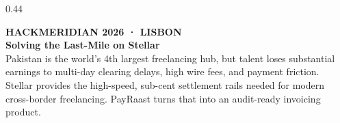 \documentclass[aspectratio=169, 10pt, t]{beamer}
\begin{document}
\begin{frame}[plain]
\begin{columns}[T]
    \begin{column}{0.44\textwidth}
      \begin{tcolorbox}[colframe=hmNavyText, colback=hmNavyText, boxrule=0.75pt,
        sharp corners, left=9pt, right=9pt, top=7pt, bottom=7pt, enhanced,
        drop fuzzy shadow=gray!12]
        
        {\fontsize{6.5}{7.5}\selectfont\bfseries\textcolor{hmYellow}{HACKMERIDIAN 2026 · LISBON}}\\[0.05cm]
        {\fontsize{9.5}{11.5}\selectfont\bfseries\textcolor{hmWhite}{Solving the Last-Mile on Stellar}}\\[0.14cm]
        
        {\fontsize{6.8}{9.2}\selectfont\textcolor{hmSilver}{
          Pakistan is the world's 4th largest freelancing hub, but talent loses substantial earnings to multi-day clearing delays, high wire fees, and payment friction.\\[0.12cm]
          Stellar provides the high-speed, sub-cent settlement rails needed for modern cross-border freelancing. PayRaast turns that into an audit-ready invoicing product.
        }}

        \vspace{0.20cm}
      \end{tcolorbox}
    \end{column}
  \end{columns}

\end{frame}
\end{document}
